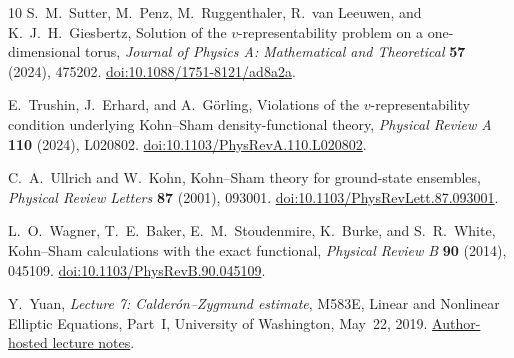 \begin{thebibliography}{10}
S.~M.~Sutter, M.~Penz, M.~Ruggenthaler, R.~van Leeuwen,
and K.~J.~H.~Giesbertz,
Solution of the \(v\)-representability problem on a one-dimensional torus,
\emph{Journal of Physics A: Mathematical and Theoretical}
\textbf{57} (2024), 475202.
\href{https://doi.org/10.1088/1751-8121/ad8a2a}{doi:10.1088/1751-8121/ad8a2a}.

E.~Trushin, J.~Erhard, and A.~G\"orling,
Violations of the \(v\)-representability condition underlying
Kohn--Sham density-functional theory,
\emph{Physical Review A} \textbf{110} (2024), L020802.
\href{https://doi.org/10.1103/PhysRevA.110.L020802}{doi:10.1103/PhysRevA.110.L020802}.

C.~A.~Ullrich and W.~Kohn,
Kohn--Sham theory for ground-state ensembles,
\emph{Physical Review Letters} \textbf{87} (2001), 093001.
\href{https://doi.org/10.1103/PhysRevLett.87.093001}{doi:10.1103/PhysRevLett.87.093001}.

L.~O.~Wagner, T.~E.~Baker, E.~M.~Stoudenmire, K.~Burke,
and S.~R.~White,
Kohn--Sham calculations with the exact functional,
\emph{Physical Review B} \textbf{90} (2014), 045109.
\href{https://doi.org/10.1103/PhysRevB.90.045109}{doi:10.1103/PhysRevB.90.045109}.

Y.~Yuan,
\emph{Lecture 7: Calder\'on--Zygmund estimate},
M583E, Linear and Nonlinear Elliptic Equations, Part~I,
University of Washington, May~22, 2019.
\href{https://sites.math.washington.edu/~yuan/class/M583ES19/lec7Calderon-Zygmund.pdf}{Author-hosted lecture notes}.

\end{thebibliography}
